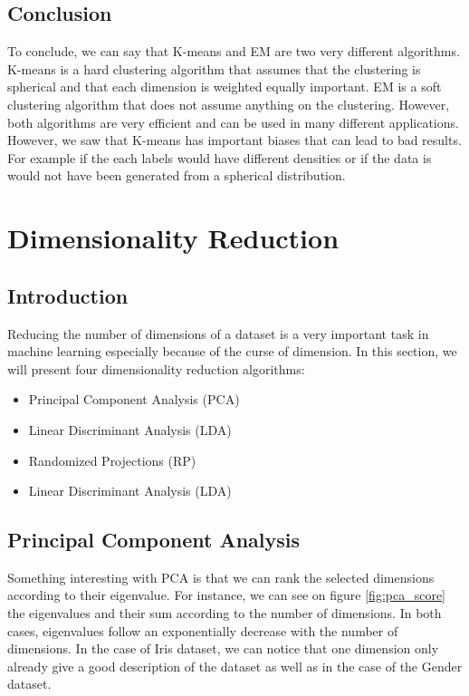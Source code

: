 \documentclass[twocolumn, 10pt]{article}
\begin{document}
		\subsection{Conclusion}
			To conclude, we can say that K-means and EM are two very different algorithms. K-means is a hard clustering algorithm that assumes that the clustering is spherical and that each dimension is weighted equally important. EM is a soft clustering algorithm that does not assume anything on the clustering. However, both algorithms are very efficient and can be used in many different applications. However, we saw that K-means has important biases that can lead to bad results. For example if the each labels would have different densities or if the data is would not have been generated from a spherical distribution.
	\section{Dimensionality Reduction}
		\subsection{Introduction}
			Reducing the number of dimensions of a dataset is a very important task in machine learning especially because of the curse of dimension. In this section, we will present four dimensionality reduction algorithms:
			\begin{itemize}
				\item Principal Component Analysis (PCA)
				\item Linear Discriminant Analysis (LDA)
				\item Randomized Projections (RP)
				\item Linear Discriminant Analysis (LDA)
			\end{itemize}
		\subsection{Principal Component Analysis}
			Something interesting with PCA is that we can rank the selected dimensions according to their eigenvalue. For instance, we can see on figure \ref{fig:pca_score} the eigenvalues and their sum according to the number of dimensions. In both cases, eigenvalues follow an exponentially decrease with the number of dimensions. In the case of Iris dataset, we can notice that one dimension only already give a good description of the dataset as well as in the case of the Gender dataset.
\end{document}
